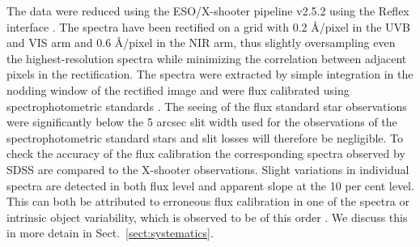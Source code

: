 \documentclass{aa}    %
\newcommand{\sectionname}{Sect.}
\newcommand{\Sect}[1]{\sectionname~\ref{sect:#1}}
\newcommand{\sect}[1]{\Sect{#1}}
\newcommand{\todo}[3]{{\color{#2}\emph{#1}: #3}}
\newcommand{\qtodo}[1]{\todo{Question}{red}{#1}}
\begin{document}
%
%
%
%
%

The data were reduced using the ESO/X-shooter pipeline v2.5.2
\citep{Modigliani2010} using the Reflex interface \citep{Freudling2013}. The
spectra have been rectified on a grid with 0.2 \AA/pixel in the UVB and VIS arm
and 0.6 \AA/pixel in the NIR arm, thus slightly oversampling even the
highest-resolution spectra while minimizing the correlation between adjacent
pixels in the rectification. The spectra were extracted by simple integration in
the nodding window of the rectified image and were flux calibrated using
spectrophotometric standards \citep{Vernet2010, Hamuy1994}. The seeing of the
flux standard star observations were significantly below the 5 arcsec slit width
used for the observations of the spectrophotometric standard stars and slit
losses will therefore be negligible. To check the accuracy of the flux
calibration the corresponding spectra observed by SDSS \citep{Ahn2014} are
compared to the X-shooter observations. Slight variations in individual spectra
are detected in both flux level and apparent slope at the 10 per cent
level. This can both be attributed to erroneous flux calibration in one of the
spectra or intrinsic object variability, which is observed to be of this order
\citep{MacLeod2012, Morganson2014}. We discuss this in more detain in
\sect{systematics}.
\end{document}
